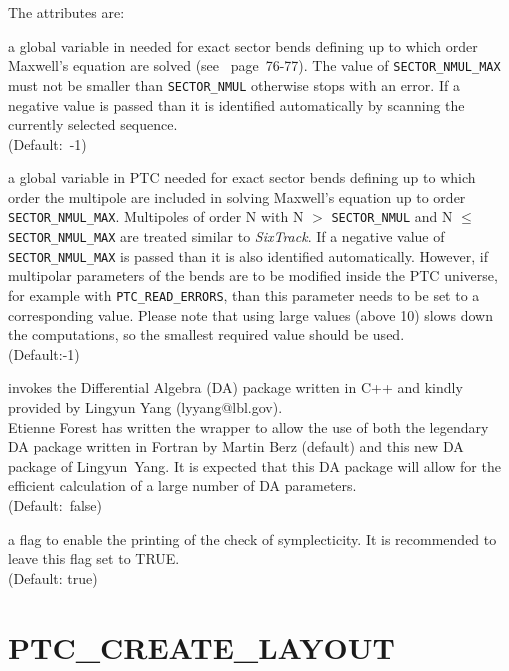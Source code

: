 The attributes are:
\begin{madlist}

    a global variable in \ptc needed for exact
   sector bends defining up to which order Maxwell's equation are solved
   (see \cite{forest2002}~page~76-77).
   The value of \texttt{SECTOR\_NMUL\_MAX} must not be smaller than
   \texttt{SECTOR\_NMUL} otherwise \madx stops with an error.
   If a negative value is passed than it is identified automatically
   by scanning the currently selected sequence.
   \\ (Default:~-1)

    a global variable in PTC needed for exact
   sector bends defining up to which order the multipole are included in
   solving Maxwell's equation up to order \texttt{SECTOR\_NMUL\_MAX}.
   Multipoles of order N with N $>$ \texttt{SECTOR\_NMUL} and N $\leq$
   \texttt{SECTOR\_NMUL\_MAX} are treated similar to \textit{SixTrack}.
   If a negative value of \\
   \texttt{SECTOR\_NMUL\_MAX} is passed than it is also identified automatically.
   However, if multipolar parameters of the bends are to be modified inside the PTC universe,
   for example with \texttt{PTC\_READ\_ERRORS},
   than this parameter needs to be set to a corresponding value.
   Please note that using large values (above 10) slows down the computations,
   so the smallest required value should be used.
   \\
   (Default:-1)

    invokes the Differential Algebra (DA) package
   written in C++ and kindly provided by Lingyun Yang (lyyang@lbl.gov). \\
   Etienne Forest has written the wrapper to allow the use of both
   the legendary DA package written in Fortran by Martin Berz
   (default) and this new DA package of Lingyun~Yang.
   It is expected that this DA package will allow for the efficient
   calculation of a large number of DA parameters. \\ (Default:~false)

    a flag to enable the printing of the check of
   symplecticity. It is recommended to leave this flag set to TRUE. \\
   (Default: true)
\end{madlist}


\section{PTC\_CREATE\_LAYOUT}
\label{sec:ptc-create-layout}

